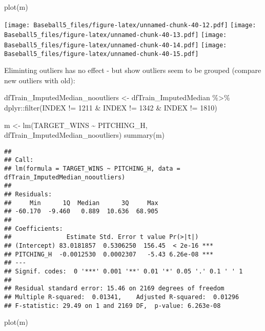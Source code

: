 \documentclass[
]{article}
\newenvironment{Shaded}{\begin{snugshade}}{\end{snugshade}}
\newcommand{\DecValTok}[1]{\textcolor[rgb]{0.00,0.00,0.81}{#1}}
\newcommand{\FunctionTok}[1]{\textcolor[rgb]{0.00,0.00,0.00}{#1}}
\newcommand{\NormalTok}[1]{#1}
\newcommand{\OtherTok}[1]{\textcolor[rgb]{0.56,0.35,0.01}{#1}}
\newcommand{\SpecialCharTok}[1]{\textcolor[rgb]{0.00,0.00,0.00}{#1}}
\begin{document}
\begin{Shaded}
\begin{Highlighting}[]
\FunctionTok{plot}\NormalTok{(m)}
\end{Highlighting}
\end{Shaded}

\texttt{[image: Baseball5\_files/figure-latex/unnamed-chunk-40-12.pdf]}
\texttt{[image: Baseball5\_files/figure-latex/unnamed-chunk-40-13.pdf]}
\texttt{[image: Baseball5\_files/figure-latex/unnamed-chunk-40-14.pdf]}
\texttt{[image: Baseball5\_files/figure-latex/unnamed-chunk-40-15.pdf]}

Eliminting outliers has no effect - but show outliers seem to be grouped
(compare new outliers with old):

\begin{Shaded}
\begin{Highlighting}[]
\NormalTok{dfTrain\_ImputedMedian\_nooutliers }\OtherTok{\textless{}{-}}\NormalTok{ dfTrain\_ImputedMedian }\SpecialCharTok{\%\textgreater{}\%}
\NormalTok{  dplyr}\SpecialCharTok{::}\FunctionTok{filter}\NormalTok{(INDEX }\SpecialCharTok{!=} \DecValTok{1211} \SpecialCharTok{\&}\NormalTok{ INDEX }\SpecialCharTok{!=} \DecValTok{1342} \SpecialCharTok{\&}\NormalTok{ INDEX }\SpecialCharTok{!=} \DecValTok{1810}\NormalTok{)}

\NormalTok{m }\OtherTok{\textless{}{-}} \FunctionTok{lm}\NormalTok{(TARGET\_WINS }\SpecialCharTok{\textasciitilde{}}\NormalTok{ PITCHING\_H, dfTrain\_ImputedMedian\_nooutliers)}
\FunctionTok{summary}\NormalTok{(m)}
\end{Highlighting}
\end{Shaded}

\begin{verbatim}
## 
## Call:
## lm(formula = TARGET_WINS ~ PITCHING_H, data = dfTrain_ImputedMedian_nooutliers)
## 
## Residuals:
##     Min      1Q  Median      3Q     Max 
## -60.170  -9.460   0.889  10.636  68.905 
## 
## Coefficients:
##               Estimate Std. Error t value Pr(>|t|)    
## (Intercept) 83.0181857  0.5306250  156.45  < 2e-16 ***
## PITCHING_H  -0.0012530  0.0002307   -5.43 6.26e-08 ***
## ---
## Signif. codes:  0 '***' 0.001 '**' 0.01 '*' 0.05 '.' 0.1 ' ' 1
## 
## Residual standard error: 15.46 on 2169 degrees of freedom
## Multiple R-squared:  0.01341,    Adjusted R-squared:  0.01296 
## F-statistic: 29.49 on 1 and 2169 DF,  p-value: 6.263e-08
\end{verbatim}

\begin{Shaded}
\begin{Highlighting}[]
\FunctionTok{plot}\NormalTok{(m)}
\end{Highlighting}
\end{Shaded}
\end{document}
